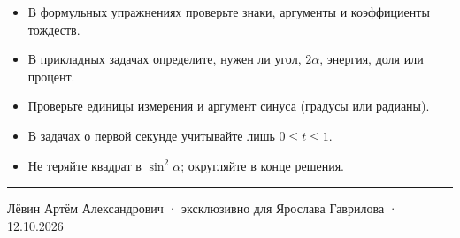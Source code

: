 \documentclass[a4paper,12pt]{article}
\begin{document}
{\small
\begin{itemize}[itemsep=1pt,topsep=2pt]
\item В формульных упражнениях проверьте знаки, аргументы и коэффициенты тождеств.
\item В прикладных задачах определите, нужен ли угол, $2\alpha$, энергия, доля или процент.
\item Проверьте единицы измерения и аргумент синуса (градусы или радианы).
\item В задачах о первой секунде учитывайте лишь $0\le t\le1$.
\item Не теряйте квадрат в $\sin^2\alpha$; округляйте в конце решения.
\end{itemize}}
\vfill
{\color{accent}\rule{\linewidth}{0.5pt}}\par
{\small\color{muted} Лёвин Артём Александрович · эксклюзивно для Ярослава Гаврилова · 12.10.2026}
\end{document}
